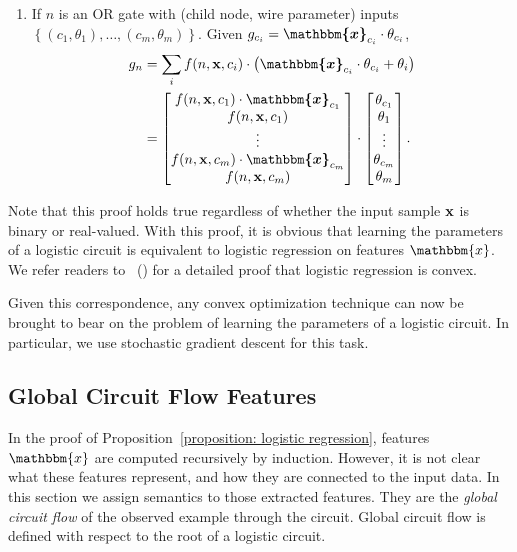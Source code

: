 \documentclass[letterpaper]{article} %
\newcommand{\node}{n}
\newcommand{\coe}{g}
\newcommand{\citet}[1]{\citeauthor{#1}~(\citeyear{#1})}
\begin{document}
\begin{itemize}
\begin{enumerate}[wide=0pt, leftmargin=\dimexpr\labelwidth + 2\labelsep\relax]
\item If $\node$ is an OR gate with (child node, wire parameter) inputs $\left\{(c_1,\theta_1),\dots,(c_m,\theta_m)\right\}$. Given $\coe_{c_i} =  \bm{\mathbbm{x}}_{c_i} \cdot \theta_{c_i}$,
\begin{align*}
\coe_\node & = \sum_i  f(n,{\bf x},c_i) \cdot \left( \bm{\mathbbm{x}}_{c_i} \cdot \theta_{c_i}+ \theta_i\right) \\
&= \begin{bmatrix}
f(n,{\bf x},c_1) \cdot\bm{\mathbbm{x}}_{c_1} \\
f(n,{\bf x},c_1) \\
\vdots \\
f(n,{\bf x},c_m) \cdot\bm{\mathbbm{x}}_{c_m} \\
f(n,{\bf x},c_m)
\end{bmatrix}
\cdot
\begin{bmatrix}
\theta_{c_1} \\
\theta_1\\
\vdots \\
\theta_{c_m} \\
\theta_m
\end{bmatrix}.
\end{align*}
\end{enumerate}
\end{itemize}

Note that this proof holds true regardless of whether the input sample ${\bf x}$ is binary or real-valued.
With this proof, it is obvious that learning the parameters of a logistic circuit is equivalent to logistic regression on features $\mathbbm{x}$.
We refer readers to \citet{Rennie2005} for a detailed proof that logistic regression is convex.

Given this correspondence, any convex optimization technique can now be brought to bear on the problem of learning the parameters of a logistic circuit. In particular, we use stochastic gradient descent for this task.


\subsection{Global Circuit Flow Features}

In the proof of Proposition~\ref{proposition: logistic regression}, features $\mathbbm{x}$  are computed recursively by induction. However, it is not clear what these features represent, and how they are connected to the input data. In this section we assign semantics to those extracted features. They are the \emph{global circuit flow} of the observed example through the circuit. Global circuit flow is defined with respect to the root of a logistic circuit.
\end{document}
